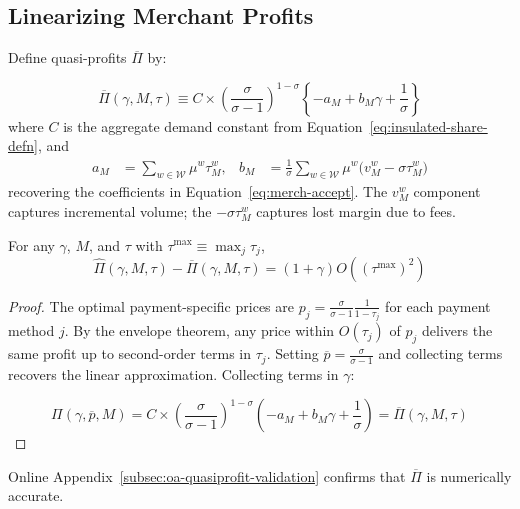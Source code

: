 \documentclass[main.tex]{subfiles}
\begin{document}
\subsection{Linearizing Merchant Profits}
\label{subsec:appendix-quasiprofits}

Define quasi-profits $\overline{\Pi}$ by:

\begin{equation}
    \overline{\Pi}\left(\gamma,M,\tau\right) \equiv C \times \left(\frac{\sigma}{\sigma-1}\right)^{1-\sigma}\left\{ -a_{M}+b_{M}\gamma+\frac{1}{\sigma}\right\} \label{eq:quasiprofit-definition}
\end{equation}
where $C$ is the aggregate demand constant from Equation~\ref{eq:insulated-share-defn}, and
\begin{align}
a_M &= \sum_{w\in\mathcal{W}} \mu^w \tau_M^w, &
b_M &= \frac{1}{\sigma}\sum_{w\in\mathcal{W}} \mu^w \bigl(v_M^w - \sigma\tau_M^w\bigr)
\end{align}
recovering the coefficients in Equation~\ref{eq:merch-accept}.
The $v_M^w$ component captures incremental volume; the $-\sigma\tau_M^w$ captures lost margin due to fees.

\begin{theorem} \label{thm:quasiprofit-approx} For any $\gamma$, $M$, and $\tau$ with $\tau^{\max}\equiv\max_{j}\tau_{j}$,
\[
\widehat{\Pi}\left(\gamma,M,\tau\right)-\overline{\Pi}\left(\gamma,M,\tau\right)=\left(1+\gamma\right)O\left(\left(\tau^{\max}\right)^{2}\right)
\]
\end{theorem}

\begin{proof}
The optimal payment-specific prices are $p_{j}=\frac{\sigma}{\sigma-1}\frac{1}{1-\tau_{j}}$ for each payment method $j$.
By the envelope theorem, any price within $O(\tau_j)$ of $p_j$ delivers the same profit up to second-order terms in $\tau_j$.
Setting $\overline{p}=\frac{\sigma}{\sigma-1}$ and collecting terms recovers the linear approximation.
Collecting terms in $\gamma$:

\[
\Pi\left(\gamma,\overline{p},M\right) =C\times\left(\frac{\sigma}{\sigma-1}\right)^{1-\sigma}\left(-a_{M}+b_{M}\gamma+\frac{1}{\sigma}\right) = \overline{\Pi}\left(\gamma,M,\tau\right)
\]
\end{proof}
Online Appendix~\ref{subsec:oa-quasiprofit-validation} confirms that $\overline{\Pi}$ is numerically accurate.
\end{document}
